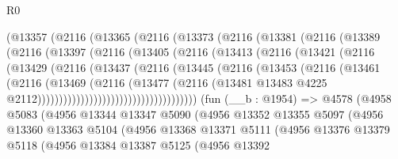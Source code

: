 \begin{lexlean}{R0}
\begin{coremodule}
            (@13357
              (@2116
                (@13365
                  (@2116
                    (@13373
                      (@2116
                        (@13381
                          (@2116
                            (@13389
                              (@2116
                                (@13397
                                  (@2116
                                    (@13405
                                      (@2116
                                        (@13413
                                          (@2116
                                            (@13421
                                              (@2116
                                                (@13429
                                                  (@2116
                                                    (@13437
                                                      (@2116
                                                        (@13445
                                                          (@2116
                                                            (@13453
                                                              (@2116
                                                                (@13461
                                                                  (@2116
                                                                    (@13469
                                                                      (@2116
                                                                        (@13477
                                                                          (@2116
                                                                            (@13481
                                                                              @13483
                                                                              @4225
                                                                              @2112)))))))))))))))))))))))))))))))))))))
    (fun (__b : @1954) =>
    @4578
      (@4958
        @5083
        (@4956
          @13344
          @13347
          @5090
          (@4956
            @13352
            @13355
            @5097
            (@4956
              @13360
              @13363
              @5104
              (@4956
                @13368
                @13371
                @5111
                (@4956
                  @13376
                  @13379
                  @5118
                  (@4956
                    @13384
                    @13387
                    @5125
                    (@4956
                      @13392

\end{coremodule}
\end{lexlean}
